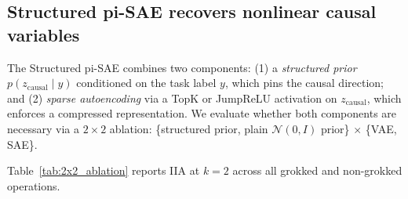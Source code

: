 
\subsection{Structured pi-SAE recovers nonlinear causal variables}
\label{sec:vae_results}

The Structured pi-SAE combines two components: (1) a \emph{structured prior}
$p(z_\text{causal} \mid y)$ conditioned on the task label $y$, which pins the
causal direction; and (2) \emph{sparse autoencoding} via a TopK or JumpReLU
activation on $z_\text{causal}$, which enforces a compressed representation.
We evaluate whether both components are necessary via a $2 \times 2$ ablation:
\{structured prior, plain $\mathcal{N}(0,I)$ prior\} $\times$ \{VAE, SAE\}.

Table~\ref{tab:2x2_ablation} reports IIA at $k=2$ across all grokked and
non-grokked operations.

